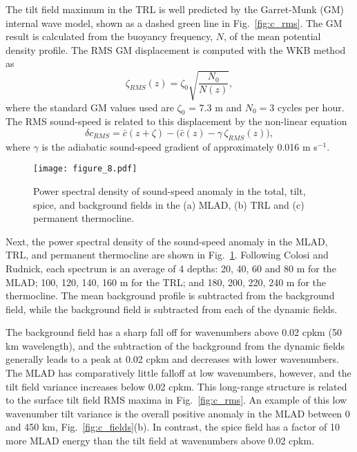 \documentclass[preprint,NumberedRefs]{JASA}
\begin{document}
The tilt field maximum in the TRL is well predicted by the Garret-Munk (GM) internal wave model, shown as a dashed green line in Fig.~\ref{fig:c_rms}. The GM result is calculated from the buoyancy frequency, $N$, of the mean potential density profile. The RMS GM displacement is computed with the WKB method as
\begin{equation*}
    \zeta_{RMS}(z) = \zeta_0 \sqrt{\frac{N_0}{N(z)}},
\end{equation*}
where the standard GM values used are $\zeta_0$ = 7.3 m and $N_0=3$ cycles per hour.\cite{colosi2016sound} The RMS sound-speed is related to this displacement by the non-linear equation
\begin{equation*}
    \delta c_{RMS} = \bar{c}(z+\zeta)-\big(\bar{c}(z) - \gamma \, \zeta_{RMS}(z)\big),
\end{equation*}
where $\gamma$ is the adiabatic sound-speed gradient of approximately 0.016 m s$^{-1}$.

\begin{figure}
\texttt{[image: figure\_8.pdf]}
        \caption{\label{fig:spectra}{Power spectral density of sound-speed anomaly in the total, tilt, spice, and background fields in the (a) MLAD, (b) TRL and (c) permanent thermocline.}}
\end{figure}
Next, the power spectral density of the sound-speed anomaly in the MLAD, TRL, and permanent thermocline are shown in Fig.~\ref{fig:spectra}. Following Colosi and Rudnick,\cite{colosi2020observations} each spectrum is an average of 4 depths: 20, 40, 60 and 80 m for the MLAD; 100, 120, 140, 160 m for the TRL; and 180, 200, 220, 240 m for the thermocline. The mean background profile is subtracted from the background field, while the background field is subtracted from each of the dynamic fields.

The background field has a sharp fall off for wavenumbers above 0.02 cpkm (50 km wavelength), and the subtraction of the background from the dynamic fields generally leads to a peak at 0.02 cpkm and decreases with lower wavenumbers. The MLAD has comparatively little falloff at low wavenumbers, however, and the tilt field variance increases below 0.02 cpkm. This long-range structure is related to the surface tilt field RMS maxima in Fig.~\ref{fig:c_rms}. An example of this low wavenumber tilt variance is the overall positive anomaly in the MLAD between 0 and 450 km, Fig.~\ref{fig:c_fields}(b). In contrast, the spice field has a factor of 10 more MLAD energy than the tilt field at wavenumbers above 0.02 cpkm.
\end{document}
